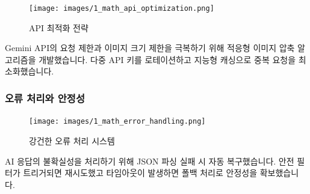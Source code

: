 \begin{figure}[H]
    \centering
    \texttt{[image: images/1\_math\_api\_optimization.png]}
    \caption{API 최적화 전략}
    \label{fig:math_api_optimization}
\end{figure}

Gemini API의 요청 제한과 이미지 크기 제한을 극복하기 위해 적응형 이미지 압축 알고리즘을 개발했습니다. 다중 API 키를 로테이션하고 지능형 캐싱으로 중복 요청을 최소화했습니다.

\subsubsection{오류 처리와 안정성}

\begin{figure}[H]
    \centering
    \texttt{[image: images/1\_math\_error\_handling.png]}
    \caption{강건한 오류 처리 시스템}
    \label{fig:math_error_handling}
\end{figure}

AI 응답의 불확실성을 처리하기 위해 JSON 파싱 실패 시 자동 복구했습니다. 안전 필터가 트리거되면 재시도했고 타임아웃이 발생하면 폴백 처리로 안정성을 확보했습니다.